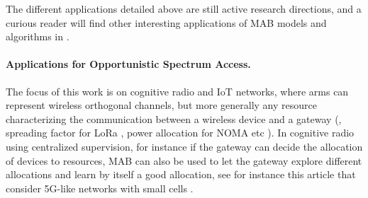 
The different applications detailed above are still active research directions,
and a curious reader will find other interesting applications of MAB models and algorithms in \cite{bouneffouf2019survey}.


\paragraph{Applications for Opportunistic Spectrum Access.}

The focus of this work is on cognitive radio and IoT networks, where arms can represent wireless orthogonal channels, but more generally any resource characterizing the communication between a wireless device and a gateway (\eg, spreading factor for LoRa \cite{KerkoucheAlami18}, power allocation for NOMA etc ). In cognitive radio using centralized supervision, for instance if the gateway can decide the allocation of devices to resources, MAB can also be used to let the gateway explore different allocations and learn by itself a good allocation, see for instance this article that consider 5G-like networks with small cells \cite{Maghsudi16}.


